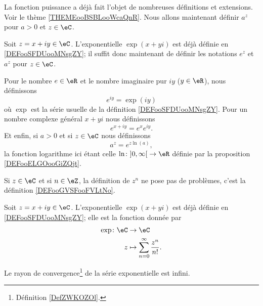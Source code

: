 La fonction puissance a déjà fait l'objet de nombreuses définitions et extensions. Voir le thème \ref{THEMEooBSBLooWcaQnR}. Nous allons maintenant définir \( a^z\) pour \( a>0\) et \( z\in \eC\).


Soit \( z=x+iy\in \eC\). L'exponentielle \( \exp(x+yi)\) est déjà définie en \ref{DEFooSFDUooMNsgZY}; il suffit donc maintenant de définir les notations \(  e^{z}\) et \( a^z\) pour \( z\in \eC\).

\begin{definition}      \label{DEFooRBTDooNLcWGj}
	Pour le nombre \( e\in \eR\) et le nombre imaginaire pur \( iy\) (\( y\in \eR\)), nous définissons
	\begin{equation}
		e^{iy}=\exp(iy)
	\end{equation}
	où \( \exp\) est la série usuelle de la définition \ref{DEFooSFDUooMNsgZY}. Pour un nombre complexe général \( x+yi\) nous définissons
	\begin{equation}
		e^{x+iy}= e^{x} e^{iy}.
	\end{equation}
	Et enfin, si \( a>0\) et si \( z\in \eC\) nous définissons
	\begin{equation}
		a^z= e^{z\ln(a)},
	\end{equation}
	la fonction logarithme ici étant celle \( \ln\colon \mathopen] 0 , \infty \mathclose[\to \eR\) définie par la proposition \ref{DEFooELGOooGiZQjt}.
\end{definition}

Si \( z\in \eC\) et si \( n\in \eZ\), la définition de \( z^n\) ne pose pas de problèmes, c'est la définition \ref{DEFooGVSFooFVLtNo}.

\begin{normaltext}  \label{DefJilXoM}
	Soit \( z=x+iy\in \eC\). L'exponentielle \( \exp(x+yi)\) est déjà définie en \ref{DEFooSFDUooMNsgZY}; elle est la fonction donnée par
	\begin{equation}
		\begin{aligned}
			\exp\colon \eC & \to \eC                                        \\
			z              & \mapsto \sum_{n=0}^{\infty}\frac{ z^n }{ n! }.
		\end{aligned}
	\end{equation}
\end{normaltext}

\begin{proposition}     \label{PROPooXEYFooIEaPvU}
	Le rayon de convergence\footnote{Définition \ref{DefZWKOZOl}.} de la série exponentielle est infini.
\end{proposition}

